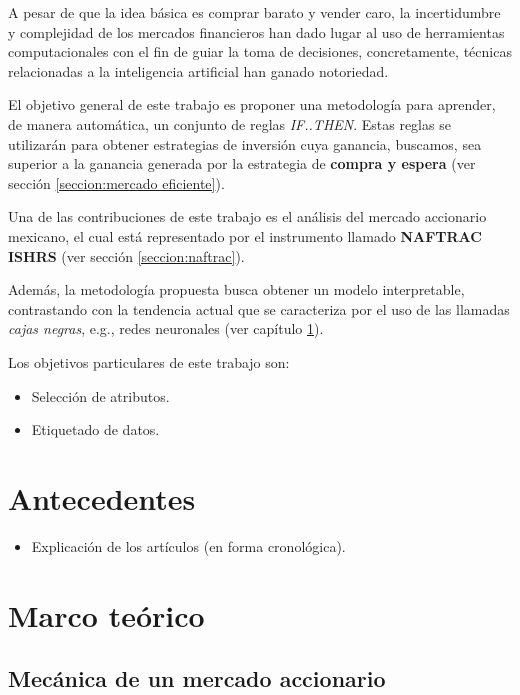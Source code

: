 \documentclass[12pt]{scrbook}
\theoremstyle{break}
\theoremstyle{break}
\begin{document}
A pesar de que la idea básica es comprar barato y vender caro, la incertidumbre y complejidad de los mercados financieros han dado lugar al uso de herramientas computacionales con el fin de guiar la toma de decisiones, concretamente, técnicas relacionadas a la inteligencia artificial han ganado notoriedad.

El objetivo general de este trabajo es proponer una metodología para aprender, de manera automática, un conjunto de reglas \textit{IF..THEN}. Estas reglas se utilizarán para obtener estrategias de inversión cuya ganancia, buscamos, sea superior a la ganancia generada por la estrategia de \textbf{compra y espera} (ver sección \ref{seccion:mercado eficiente}).

Una de las contribuciones de este trabajo es el análisis del mercado accionario mexicano, el cual está representado por el instrumento llamado \textbf{NAFTRAC ISHRS} (ver sección \ref{seccion:naftrac}).

Además, la metodología propuesta busca obtener un modelo interpretable, contrastando con la tendencia actual que se caracteriza por el uso de las llamadas \textit{cajas negras}, e.g., redes neuronales (ver capítulo \ref{capitulo:antecedentes}).

Los objetivos particulares de este trabajo son:
\begin{itemize}
\item Selección de atributos.

\item Etiquetado de datos.
\end{itemize}




\chapter{Antecedentes}
\label{capitulo:antecedentes}
\begin{itemize}
\item Explicación de los artículos (en forma cronológica).
\end{itemize}

\chapter{Marco teórico}
\label{capitulo:marco teorico}

\section{Mecánica de un mercado accionario}
\label{seccion:mecanica del mercado}
\end{document}
